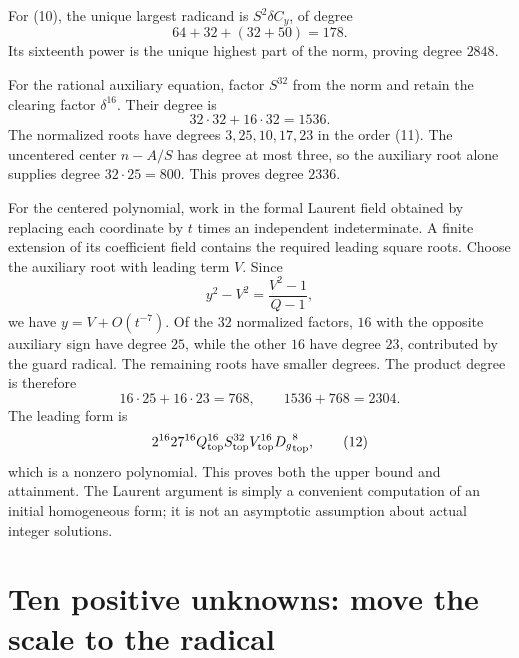 \documentclass[11pt,letterpaper]{article}
\theoremstyle{definition}\newtheorem{definition}[theorem]{Definition}
\theoremstyle{remark}\newtheorem{remark}[theorem]{Remark}
\begin{document}
For (10), the unique largest radicand is $S^2\delta C_y$, of degree
\[
 64+32+(32+50)=178.
\]
Its sixteenth power is the unique highest part of the norm, proving degree $2848$.

For the rational auxiliary equation, factor $S^{32}$ from the norm and retain the clearing factor $\delta^{16}$. Their degree is
\[
 32\cdot32+16\cdot32=1536.
\]
The normalized roots have degrees $3,25,10,17,23$ in the order (11). The uncentered center $n-A/S$ has degree at most three, so the auxiliary root alone supplies degree $32\cdot25=800$. This proves degree $2336$.

For the centered polynomial, work in the formal Laurent field obtained by replacing each coordinate by $t$ times an independent indeterminate. A finite extension of its coefficient field contains the required leading square roots. Choose the auxiliary root with leading term $V$. Since
\[
 y^2-V^2=\frac{V^2-1}{Q-1},
\]
we have $y=V+O(t^{-7})$. Of the $32$ normalized factors, $16$ with the opposite auxiliary sign have degree $25$, while the other $16$ have degree $23$, contributed by the guard radical. The remaining roots have smaller degrees. The product degree is therefore
\[
 16\cdot25+16\cdot23=768,
 \qquad1536+768=2304.
\]
The leading form is
\[
 2^{16}27^{16}{Q}_{\mathrm{top}}^{16}{S}_{\mathrm{top}}^{32}
 {V}_{\mathrm{top}}^{16}{D_g}_{\mathrm{top}}^{8},
 \tag{12}\label{eq:leader12}
\]
which is a nonzero polynomial. This proves both the upper bound and attainment. The Laurent argument is simply a convenient computation of an initial homogeneous form; it is not an asymptotic assumption about actual integer solutions.

\section{Ten positive unknowns: move the scale to the radical}
\end{document}
